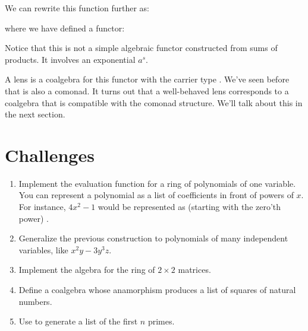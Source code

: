We can rewrite this function further as:

where we have defined a functor:

Notice that this is not a simple algebraic functor constructed from sums
of products. It involves an exponential $a^s$.

A lens is a coalgebra for this functor with the carrier type .
We've seen before that  is also a comonad. It turns out
that a well-behaved lens corresponds to a coalgebra that is compatible
with the comonad structure. We'll talk about this in the next section.

\section{Challenges}

\begin{enumerate}
\tightlist
\item
  Implement the evaluation function for a ring of polynomials of one
  variable. You can represent a polynomial as a list of coefficients in
  front of powers of $x$. For instance, $4x^2-1$ would be
  represented as (starting with the zero'th power)
  \code{{[}-1, 0, 4{]}}.
\item
  Generalize the previous construction to polynomials of many
  independent variables, like $x^2y-3y^3z$.
\item
  Implement the algebra for the ring of $2\times{}2$ matrices.
\item
  Define a coalgebra whose anamorphism produces a list of squares of
  natural numbers.
\item
  Use  to generate a list of the first $n$ primes.
\end{enumerate}
